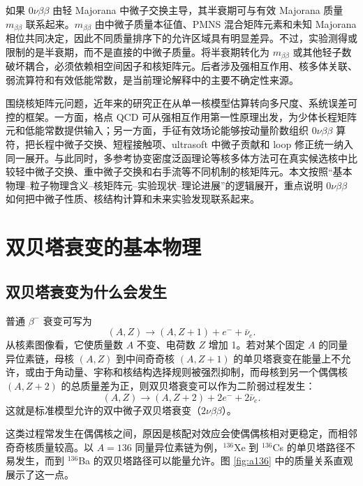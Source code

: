 \documentclass[12pt,a4paper]{ctexart}
\begin{document}
如果 $0\nu\beta\beta$ 由轻 Majorana 中微子交换主导，其半衰期可与有效 Majorana 质量 $m_{\beta\beta}$ 联系起来。$m_{\beta\beta}$ 由中微子质量本征值、PMNS 混合矩阵元素和未知 Majorana 相位共同决定，因此不同质量排序下的允许区域具有明显差异。不过，实验测得或限制的是半衰期，而不是直接的中微子质量。将半衰期转化为 $m_{\beta\beta}$ 或其他轻子数破坏耦合，必须依赖相空间因子和核矩阵元。后者涉及强相互作用、核多体关联、弱流算符和有效低能常数，是当前理论解释中的主要不确定性来源。

围绕核矩阵元问题，近年来的研究正在从单一核模型估算转向多尺度、系统误差可控的框架。一方面，格点 QCD 可从强相互作用第一性原理出发，为少体长程矩阵元和低能常数提供输入；另一方面，手征有效场论能够按动量阶数组织 $0\nu\beta\beta$ 算符，把长程中微子交换、短程接触项、ultrasoft 中微子贡献和 loop 修正统一纳入同一展开。与此同时，多参考协变密度泛函理论等核多体方法可在真实候选核中比较轻中微子交换、重中微子交换和右手流等不同机制的核矩阵元。本文按照“基本物理--粒子物理含义--核矩阵元--实验现状--理论进展”的逻辑展开，重点说明 $0\nu\beta\beta$ 如何把中微子性质、核结构计算和未来实验发现联系起来。

\section{双贝塔衰变的基本物理}

\subsection{双贝塔衰变为什么会发生}

普通 $\beta^-$ 衰变可写为
\begin{equation}
	(A,Z)\rightarrow(A,Z+1)+e^-+\bar{\nu}_e .
\end{equation}
从核素图像看，它使质量数 $A$ 不变、电荷数 $Z$ 增加 1。若对某个固定 $A$ 的同量异位素链，母核 $(A,Z)$ 到中间奇奇核 $(A,Z+1)$ 的单贝塔衰变在能量上不允许，或由于角动量、宇称和核结构选择规则被强烈抑制，而母核到另一个偶偶核 $(A,Z+2)$ 的总质量差为正，则双贝塔衰变可以作为二阶弱过程发生：
\begin{equation}
	(A,Z)\rightarrow(A,Z+2)+2e^-+2\bar{\nu}_e .
	\label{eq:2nubb}
\end{equation}
这就是标准模型允许的双中微子双贝塔衰变（$2\nu\beta\beta$）。

这类过程常发生在偶偶核之间，原因是核配对效应会使偶偶核相对更稳定，而相邻奇奇核质量较高。以 $A=136$ 同量异位素链为例，$^{136}$Xe 到 $^{136}$Cs 的单贝塔路径不易发生，而到 $^{136}$Ba 的双贝塔路径可以能量允许。图 \ref{fig:a136} 中的质量关系直观展示了这一点。
\end{document}
